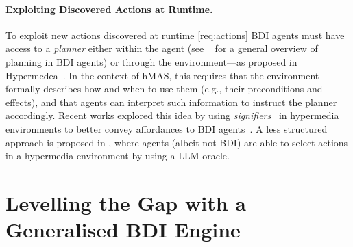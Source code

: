 


\paragraph{Exploiting Discovered Actions at Runtime.}

To exploit new actions discovered at runtime \ref{req:actions} \ac{BDI} agents must have access to a \emph{planner} either within the agent (see ~\cite{MeneguzziS15} for a general overview of planning in \ac{BDI} agents) or through the environment---as proposed in Hypermedea~\cite{DBLP:conf/www/CharpenayZLB22}.
%
In the context of \ac{hMAS}, 
this requires that the environment 
formally describes how and when to use them 
(e.g., their preconditions and effects),
and that agents can interpret such information to instruct the planner accordingly.
%
Recent works explored this idea by using \emph{signifiers}~\cite{vachtsevanou2023atal} in hypermedia environments to better convey affordances to \ac{BDI} agents~\cite{vachtsevanou2024atal}.
%
A less structured approach is proposed in \cite{10.1145/3603163.3609077,schmid2024kgswc},
where agents (albeit not \ac{BDI}) are able to select actions in a hypermedia environment by using a \ac{LLM} oracle.

\section{Levelling the Gap with a Generalised \ac{BDI} Engine}
\label{sec:generalised-bdi-engine}

